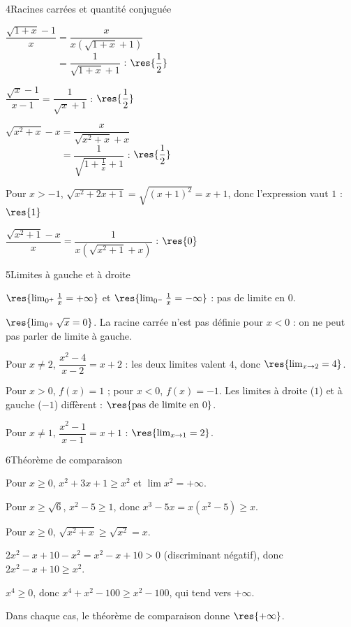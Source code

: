 \begin{deuxcolonnes}
\begin{corrige}{4}{Racines carrées et quantité conjuguée}
\begin{questions}
  \item $\dfrac{\sqrt{1+x}-1}{x}=\dfrac{x}{x\left(\sqrt{1+x}+1\right)}$\\[1mm]
    $\phantom{\dfrac{\sqrt{1+x}-1}{x}}=\dfrac{1}{\sqrt{1+x}+1}$ : $\res{\dfrac12}$
  \item $\dfrac{\sqrt{x}-1}{x-1}=\dfrac{1}{\sqrt{x}+1}$ : $\res{\dfrac12}$
  \item $\sqrt{x^{2}+x}-x=\dfrac{x}{\sqrt{x^{2}+x}+x}$\\[1mm]
    $\phantom{\sqrt{x^{2}+x}-x}=\dfrac{1}{\sqrt{1+\frac1x}+1}$ : $\res{\dfrac12}$
  \item Pour $x>-1$, $\sqrt{x^{2}+2x+1}=\sqrt{(x+1)^{2}}=x+1$, donc l'expression vaut $1$ : $\res{1}$
  \item $\dfrac{\sqrt{x^{2}+1}-x}{x}=\dfrac{1}{x\left(\sqrt{x^{2}+1}+x\right)}$ : $\res{0}$
\end{questions}
\end{corrige}

\begin{corrige}{5}{Limites à gauche et à droite}
\begin{questions}
  \item $\res{\lim_{0^{+}}\frac1x=+\infty}$ et $\res{\lim_{0^{-}}\frac1x=-\infty}$ : pas de limite en $0$.
  \item $\res{\lim_{0^{+}}\sqrt{x}=0}$. La racine carrée n'est pas définie pour $x<0$ : on ne peut pas parler de limite à gauche.
  \item Pour $x\neq2$, $\dfrac{x^{2}-4}{x-2}=x+2$ : les deux limites valent $4$, donc $\res{\lim_{x\to2}=4}$.
  \item Pour $x>0$, $f(x)=1$ ; pour $x<0$, $f(x)=-1$. Les limites à droite ($1$) et à gauche ($-1$) diffèrent : $\res{\text{pas de limite en }0}$.
  \item Pour $x\neq1$, $\dfrac{x^{2}-1}{x-1}=x+1$ : $\res{\lim_{x\to1}=2}$.
\end{questions}
\end{corrige}

\begin{corrige}{6}{Théorème de comparaison}
\begin{questions}
  \item Pour $x\geq0$, $x^{2}+3x+1\geq x^{2}$ et $\lim x^{2}=+\infty$.
  \item Pour $x\geq\sqrt6$, $x^{2}-5\geq1$, donc $x^{3}-5x=x\left(x^{2}-5\right)\geq x$.
  \item Pour $x\geq0$, $\sqrt{x^{2}+x}\geq\sqrt{x^{2}}=x$.
  \item $2x^{2}-x+10-x^{2}=x^{2}-x+10>0$ (discriminant négatif), donc $2x^{2}-x+10\geq x^{2}$.
  \item $x^{4}\geq0$, donc $x^{4}+x^{2}-100\geq x^{2}-100$, qui tend vers $+\infty$.
\end{questions}
Dans chaque cas, le théorème de comparaison donne $\res{+\infty}$.
\end{corrige}


\end{deuxcolonnes}
